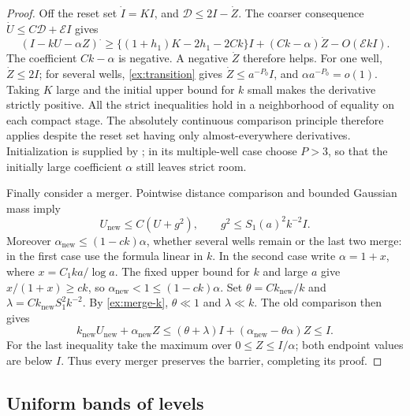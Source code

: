\begin{proof}
Off the reset set \(\dot I=KI\), and
\(\mathcal D\le2I-\dot Z\). The coarser consequence
\(\dot U\le C\mathcal D+\mathcal E I\) gives
\[
 (I-kU-\alpha Z)^{\boldsymbol\cdot}
 \ge\{(1+h_1)K-2h_1-2Ck\}I
          +(Ck-\alpha)\dot Z-O(\mathcal E kI).
\]
The coefficient \(Ck-\alpha\) is negative. A negative \(\dot Z\)
therefore helps. For one well, \(\dot Z\le2I\); for several wells,
\eqref{ex:transition} gives \(\dot Z\le a^{-P_0}I\), and
\(\alpha a^{-P_0}=o(1)\). Taking \(K\) large and the initial
upper bound for \(k\) small makes the derivative strictly positive.
All the strict inequalities hold in a neighborhood of equality on
each compact stage. The absolutely continuous comparison principle
therefore applies despite the reset set having only almost-everywhere
derivatives. Initialization is supplied by
; in its multiple-well case choose
\(P>3\), so that the initially large coefficient \(\alpha\)
still leaves strict room.

Finally consider a merger. Pointwise distance comparison and bounded
Gaussian mass imply
\[
 U_{\mathrm{new}}\le C(U+g^2),\qquad
 g^2\le S_1(a)^2k^{-2}I.
\]
Moreover \(\alpha_{\mathrm{new}}\le(1-ck)\alpha\), whether
several wells remain or the last two merge: in the first case use
the formula linear in \(k\). In the second case write
\(\alpha=1+x\), where \(x=C_1ka/\log a\). The fixed upper bound
for \(k\) and large \(a\) give \(x/(1+x)\ge ck\), so
\(\alpha_{\mathrm{new}}<1\le(1-ck)\alpha\).
Set \(\theta=Ck_{\mathrm{new}}/k\) and
\(\lambda=Ck_{\mathrm{new}}S_1^2k^{-2}\). By
\eqref{ex:merge-k}, \(\theta\ll1\) and \(\lambda\ll k\).
The old comparison then gives
\[
 k_{\mathrm{new}}U_{\mathrm{new}}+\alpha_{\mathrm{new}}Z
 \le(\theta+\lambda)I+
        (\alpha_{\mathrm{new}}-\theta\alpha)Z\le I.
\]
For the last inequality take the maximum over
\(0\le Z\le I/\alpha\); both endpoint values are below \(I\).
Thus every merger preserves the barrier, completing its proof.
\end{proof}

\subsection{Uniform bands of levels}

